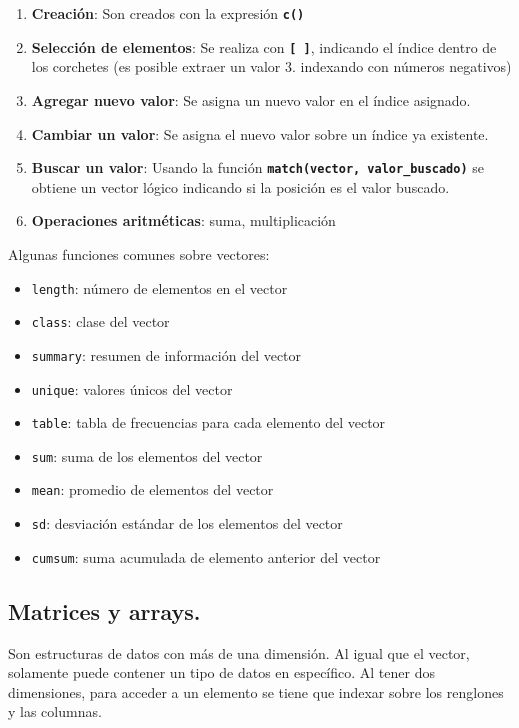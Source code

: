 \documentclass[]{book}
\begin{document}
\begin{enumerate}
\def\labelenumi{\arabic{enumi}.}
\item
  \textbf{Creación}: Son creados con la expresión \textbf{\texttt{c()}}
\item
  \textbf{Selección de elementos}: Se realiza con \textbf{\texttt{{[}\ {]}}}, indicando el índice dentro de los corchetes (es posible extraer un valor 3. indexando con números negativos)
\item
  \textbf{Agregar nuevo valor}: Se asigna un nuevo valor en el índice asignado.
\item
  \textbf{Cambiar un valor}: Se asigna el nuevo valor sobre un índice ya existente.
\item
  \textbf{Buscar un valor}: Usando la función \textbf{\texttt{match(vector,\ valor\_buscado)}} se obtiene un vector lógico indicando si la posición es el valor buscado.
\item
  \textbf{Operaciones aritméticas}: suma, multiplicación
\end{enumerate}

Algunas funciones comunes sobre vectores:

\begin{itemize}
\item
  \texttt{length}: número de elementos en el vector
\item
  \texttt{class}: clase del vector
\item
  \texttt{summary}: resumen de información del vector
\item
  \texttt{unique}: valores únicos del vector
\item
  \texttt{table}: tabla de frecuencias para cada elemento del vector
\item
  \texttt{sum}: suma de los elementos del vector
\item
  \texttt{mean}: promedio de elementos del vector
\item
  \texttt{sd}: desviación estándar de los elementos del vector
\item
  \texttt{cumsum}: suma acumulada de elemento anterior del vector
\end{itemize}

\hypertarget{matrices-y-arrays.}{%
\subsection{Matrices y arrays.}\label{matrices-y-arrays.}}

Son estructuras de datos con más de una dimensión. Al igual que el vector, solamente puede contener un tipo de datos en específico. Al tener dos dimensiones, para acceder a un elemento se tiene que indexar sobre los renglones y las columnas.
\end{document}
